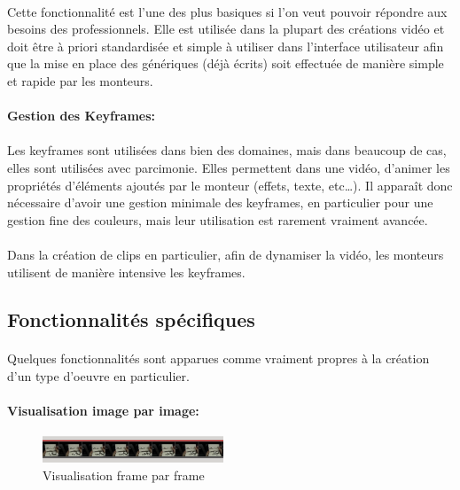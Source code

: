 \paragraph{}
Cette fonctionnalité est l'une des plus basiques si
l'on veut pouvoir répondre aux besoins des professionnels. Elle est utilisée
dans la plupart des créations vidéo et doit être à priori standardisée et
simple à utiliser dans l'interface utilisateur afin que la mise en place
des génériques (déjà écrits) soit effectuée de manière simple et rapide
par les monteurs.

\paragraph{Gestion des Keyframes:}
\paragraph{}

Les keyframes sont utilisées dans bien des domaines, mais dans beaucoup de cas, elles sont
utilisées avec parcimonie. Elles permettent dans une vidéo, d'animer les propriétés
d'éléments ajoutés par le monteur (effets, texte, etc\ldots). Il
apparaît donc nécessaire d'avoir une gestion minimale des keyframes,
en particulier pour une gestion fine des couleurs, mais leur utilisation est
rarement vraiment avancée.

\paragraph{}
Dans la création de clips en particulier, afin de dynamiser la vidéo,
les monteurs utilisent de manière intensive les keyframes.

\subsection{Fonctionnalités spécifiques}

\paragraph{}
Quelques fonctionnalités sont apparues comme vraiment propres à la création
d'un type d'oeuvre en particulier.

\paragraph{Visualisation image par image:}
\begin{figure}
    \begin{center}
      \includegraphics[width=0.48\textwidth]{images/frameByFrame}
    \end{center} \caption{Visualisation frame par frame} \label{Yes}
\end{figure}

